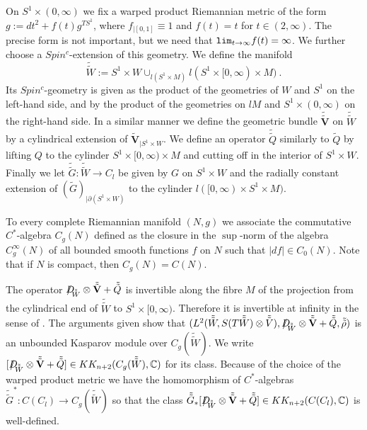 \documentclass[12pt]{article}
\newcommand{\C}{{\mathbb{C}}}
\newcommand{\bV}{{\mathbf{V}}}
\newcommand{\Dirac}{{D\hspace{-0.27cm}/}}
\renewcommand{\lim}{{\tt lim}}
\begin{document}
On $S^{1}\times (0,\infty)$ we fix a warped product Riemannian metric of the form $g:=dt^{2}+f(t) g^{TS^{1}}$, where $f_{|[0,1]}\equiv 1$ and $f(t)=t$ for $t\in(2,\infty)$. The precise form is not important, but we need that $\lim_{t\to \infty} f(t)=\infty$. We further choose a $Spin^{c}$-extension of this geometry.
We define the manifold
$$\tilde{\tilde W}:=S^{1}\times W\cup_{l(S^{1}\times M)}l(S^{1}\times  [0,\infty)\times M)\ .$$
Its $Spin^{c}$-geometry is given as the product of the geometries of $W$ and $S^{1}$ on the left-hand side, and by the product of the geometries on $lM$ and $S^{1}\times (0,\infty)$ on the right-hand side.
In a similar manner we define the geometric bundle $\tilde{\tilde \bV}$ on $\tilde{\tilde W}$ by a cylindrical extension of $\tilde \bV_{|S^{1}\times W}$. 
We define an operator
$\tilde{\tilde Q}$ similarly to $\tilde Q$ by lifting $Q$ to the cylinder $S^{1}\times [0,\infty)\times M$ and cutting off in the interior of $S^{1}\times W$.
Finally we let $\tilde {\tilde G}:\tilde{\tilde W}\to C_{l}$
be given by $G$ on $S^{1}\times W$ and the radially constant extension 
of $(\tilde G)_{|\partial (S^{1}\times W)}$ to the cylinder $l([0,\infty)\times S^{1}\times M)$.

 

To every complete   Riemannian manifold $(N,g)$ we associate the  commutative $C^{*}$-algebra 
$C_{g}(N)$ defined as the closure  in the $\sup$-norm of the algebra $C_{g}^{\infty}(N)$ of all bounded smooth functions $f$ on $N$ such that $|df|\in C_{0}(N)$. Note that if $N$ is compact, then
$C_{g}(N)=C(N)$.
 
 






The operator $\Dirac_{\tilde{\tilde W}}\otimes \tilde {\tilde \bV}+\tilde {\tilde Q}$ is invertible along the fibre
$M$ of the projection from the cylindrical end of $\tilde{\tilde W}$ to  $S^{1}\times  [0,\infty)$.
Therefore it is invertible at infinity in the sense of  \cite[Assumption 1]{MR1348799}. The arguments given \cite[Section 1]{MR1348799} show that
$(L^{2}(\tilde{\tilde W},S(T\tilde{\tilde W})\otimes \tilde{\tilde V}),\Dirac_{\tilde{\tilde W}}\otimes \tilde {\tilde \bV}+\tilde {\tilde Q}, \tilde{\tilde \rho})$ is an unbounded Kasparov module over  $C_{g}(\tilde{\tilde W})$. We write $[\Dirac_{\tilde{\tilde W}}\otimes \tilde {\tilde \bV}+\tilde {\tilde Q}]\in KK_{n+2}(C_{g}(\tilde{\tilde W}),\C)$ for its class.
 Because of the choice of the warped product metric we have the homomorphism of $C^{*}$-algebras
$\tilde{\tilde G}^{*}:C(C_{l})\to C_{g}(\tilde{\tilde W})$ so that the class
$\tilde{\tilde G}_{*}[\Dirac_{\tilde{\tilde W}}\otimes \tilde {\tilde \bV}+\tilde {\tilde Q}]\in KK_{n+2}(C(C_{l}),\C)$ is well-defined.
\end{document}
